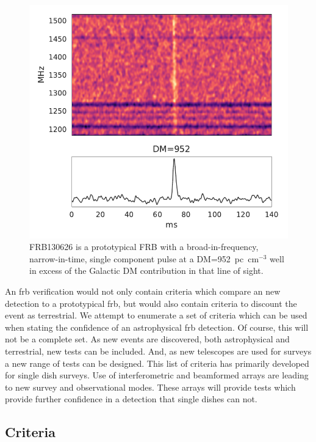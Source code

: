 \documentclass[a4paper,fleqn,usenatbib]{mnras}
\begin{document}
\begin{figure}
    \includegraphics[width=1.0\linewidth]{figures/FRB130626.pdf}
    \caption{FRB130626 is a prototypical FRB with a broad-in-frequency,
    narrow-in-time, single component pulse at a DM=952~pc~cm$^{-3}$ well in
    excess of the Galactic DM contribution in that line of sight.
    }
    \label{fig:FRB130626}
\end{figure}

An \gls{frb} verification would not only contain criteria which compare an new
detection to a prototypical \gls{frb}, but would also contain criteria to
discount the event as terrestrial. We attempt to enumerate a set of criteria
which can be used when stating the confidence of an astrophysical \gls{frb}
detection. Of course, this will not be a complete set. As new events are
discovered, both astrophysical and terrestrial, new tests can be included. And,
as new telescopes are used for surveys a new range of tests can be designed.
This list of criteria has primarily developed for single dish surveys.  Use of
interferometric and beamformed arrays are leading to new survey and
observational modes. These arrays will provide tests which provide further
confidence in a detection that single dishes can not.

\subsection{Criteria}
\end{document}
